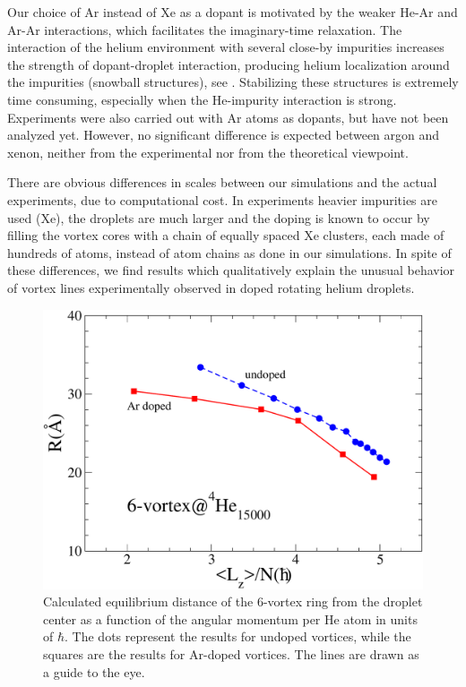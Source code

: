 		Our choice of Ar instead of Xe as a dopant is motivated by the weaker He-Ar and Ar-Ar interactions, which 
		facilitates the imaginary-time relaxation. The interaction of the helium environment with several close-by impurities increases the 
		strength of  dopant-droplet interaction, producing  
		helium localization around the impurities (snowball structures), see . Stabilizing these
		structures is extremely time consuming, 
		especially when the He-impurity interaction is strong.
		Experiments were also carried out with Ar atoms as dopants, 
		but have not been analyzed yet.
		However, no significant difference is expected between argon and xenon, 
		neither from the experimental nor from the theoretical viewpoint.
		
		There are obvious differences in scales between our simulations and  
		 the actual experiments,  due to  computational 
		cost. In experiments heavier impurities are used (Xe), 
		the droplets are much larger
		and the doping is known to occur by filling the vortex cores with a chain 
		of equally spaced Xe clusters, each made of
		hundreds of atoms, instead of atom chains as done in our simulations.
		In spite of these differences, we find results which  
		qualitatively explain the unusual behavior of vortex lines 
		experimentally observed in doped rotating helium droplets.
		
		\begin{figure}[!]
		\centerline{\includegraphics[width=0.9\linewidth,clip]{fig14}}
		\caption{\label{fig14-capture} 
		Calculated equilibrium distance of the 6-vortex ring
		from the droplet center as a function of the 
		angular momentum per He atom in units of $\hbar$. 
		The dots represent the results for undoped vortices, while the squares are the results for 
		Ar-doped vortices. The lines are drawn as a guide to the eye.
		}
		\end{figure}
		
